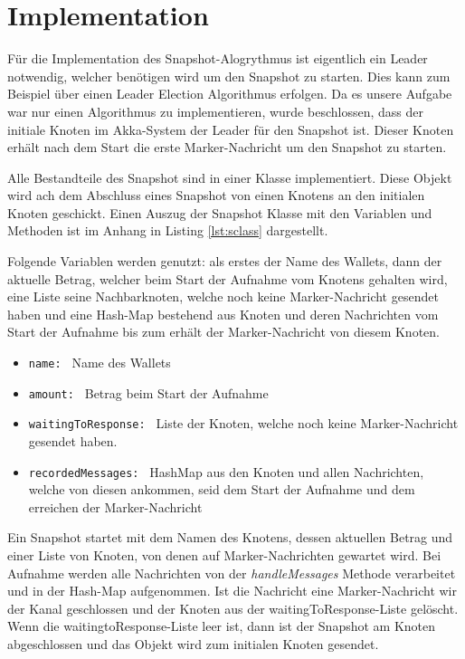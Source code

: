\section{Implementation}
\label{sec:impl}
Für die Implementation des Snapshot-Alogrythmus ist eigentlich ein Leader 
notwendig, welcher benötigen wird um den Snapshot zu starten. Dies kann zum
Beispiel über einen Leader Election Algorithmus erfolgen. Da es unsere Aufgabe
war nur einen Algorithmus zu implementieren, wurde beschlossen, dass der 
initiale Knoten im Akka-System der Leader für den Snapshot ist. Dieser Knoten 
erhält nach dem Start die erste Marker-Nachricht um den Snapshot zu starten.

Alle Bestandteile des Snapshot sind in einer Klasse implementiert. 
Diese Objekt wird ach dem Abschluss eines Snapshot von einen Knotens an den
initialen Knoten geschickt.
Einen Auszug der Snapshot Klasse mit den Variablen und Methoden ist im Anhang
in Listing \ref{lst:sclass} dargestellt.

Folgende Variablen werden genutzt: als erstes der Name des Wallets, dann
der aktuelle Betrag, welcher beim Start der Aufnahme vom Knotens gehalten wird,
eine Liste seine Nachbarknoten, welche noch keine Marker-Nachricht gesendet
haben und eine Hash-Map bestehend aus Knoten und deren Nachrichten vom Start
der Aufnahme bis zum erhält der Marker-Nachricht von diesem Knoten.

\begin{itemize}
 \item \texttt{name: } Name des Wallets
 \item \texttt{amount: } Betrag beim Start der Aufnahme
 \item \texttt{waitingToResponse: } Liste der Knoten, welche noch keine 
 Marker-Nachricht gesendet haben.
 \item \texttt{recordedMessages: } HashMap aus den Knoten und allen Nachrichten, 
 welche von diesen ankommen, seid dem Start der Aufnahme und dem erreichen der
 Marker-Nachricht
\end{itemize}

Ein Snapshot startet mit dem Namen des Knotens, dessen aktuellen Betrag und 
einer Liste von Knoten, von denen auf Marker-Nachrichten gewartet wird.
Bei Aufnahme werden alle Nachrichten von der \textit{handleMessages} Methode
verarbeitet und in der Hash-Map aufgenommen.
Ist die Nachricht eine Marker-Nachricht wir der Kanal geschlossen und der
Knoten aus der waitingToResponse-Liste gelöscht.
Wenn die waitingtoResponse-Liste leer ist, dann ist der Snapshot am Knoten
abgeschlossen und das Objekt wird zum initialen Knoten gesendet.

